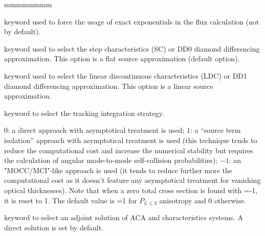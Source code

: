\begin{ListeDeDescription}{mmmmmmmm}
\item[\moc{LEXF}] keyword used to force the usage of exact exponentials in the flux calculation (not by default).

\item[\moc{SC}] keyword used to select the step characteristics (SC) or DD0 diamond differencing approximation. This
option is a flat source approximation (default option).

\item[\moc{LDC}] keyword used to select the linear discontinuous characteristics (LDC) or DD1 diamond differencing approximation. This
option is a linear source approximation.

\item[\moc{STIS}] keyword to select the tracking integration strategy.

\item[\dusa{istis}] $0$: a direct approach with asymptotical treatment is used; $1$: a ``source term isolation'' approach with asymptotical treatment is used (this technique tends to reduce the computational cost and increase the numerical stability but requires the calculation of angular mode-to-mode self-collision probabilities); $-1$:  an "MOCC/MCI"-like approach is used (it tends to reduce further more the computational cost as it doesn't feature any asymptotical treatment for vanishing optical thicknesses). Note that when a zero total cross section is found with =-1, it is reset to 1. The default value is =1 for $P_{L \le 3}$ anisotropy and 0 otherwise.

\item[\moc{ADJ}] keyword to select an adjoint solution of ACA and characteristics systems. A direct solution is
set by default.

\end{ListeDeDescription}
\eject
